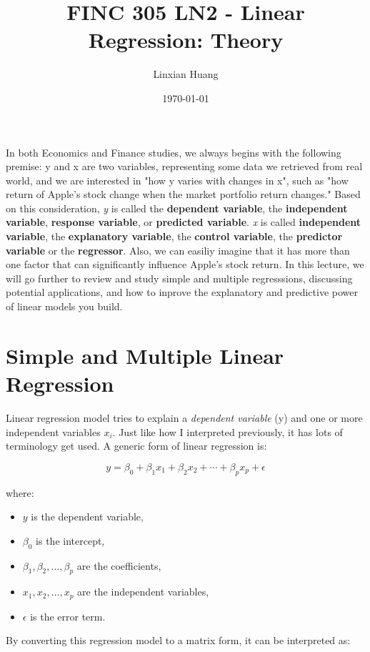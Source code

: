 \documentclass[11pt]{article}
\title{FINC 305 LN2 - Linear Regression: Theory}
\author{Linxian Huang}
\date{\today}
\begin{document}
\maketitle
   In both Economics and Finance studies, we always begins with the following premise: y and x are two variables, 
   representing some data we retrieved from real world, and we are interested in "how y varies with changes in x", 
   such as "how return of Apple's stock change when the market portfolio return changes." Based on this consideration, 
   \textit{y} is called the \textbf{dependent variable}, the \textbf{independent variable}, \textbf{response variable}, or
   \textbf{predicted variable}. \textit{x} is called \textbf{independent variable}, the \textbf{explanatory variable}, 
   the \textbf{control variable}, the \textbf{predictor variable} or the \textbf{regressor}. Also, we can easiliy imagine that
   it has more than one factor that can significantly influence Apple's stock return. In this lecture, we will go further
   to review and study simple and multiple regresssions, discussing potential applications, and how to inprove the explanatory 
   and predictive power of linear models you build. \\

\section{Simple and Multiple Linear Regression}

Linear regression model tries to explain a \textit{dependent variable} (y) and one or more independent variables $x_i$. Just like 
how I interpreted previously, it has lots of terminology get used. A generic form of linear regression is:

\[
y = \beta_0 + \beta_1 x_1 + \beta_2 x_2 + \cdots + \beta_p x_p + \epsilon
\]

where:
\begin{itemize}
    \item \(y\) is the dependent variable,
    \item \(\beta_0\) is the intercept,
    \item \(\beta_1, \beta_2, \dots, \beta_p\) are the coefficients,
    \item \(x_1, x_2, \dots, x_p\) are the independent variables,
    \item \(\epsilon\) is the error term.
\end{itemize}

By converting this regression model to a matrix form, it can be interpreted as:
\end{document}
